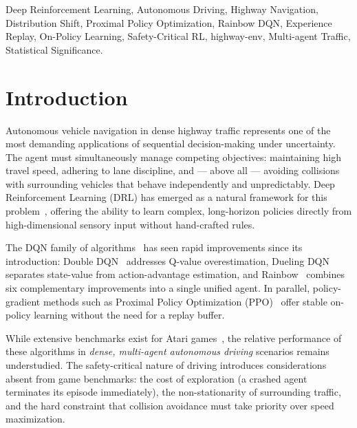 \documentclass[conference]{IEEEtran}
\begin{document}
\begin{IEEEkeywords}
Deep Reinforcement Learning, Autonomous Driving, Highway Navigation, Distribution Shift,
Proximal Policy Optimization, Rainbow DQN, Experience Replay, On-Policy Learning,
Safety-Critical RL, highway-env, Multi-agent Traffic, Statistical Significance.
\end{IEEEkeywords}

\section{Introduction}

Autonomous vehicle navigation in dense highway traffic represents one of the most
demanding applications of sequential decision-making under uncertainty.
The agent must simultaneously manage competing objectives: maintaining high travel speed,
adhering to lane discipline, and — above all — avoiding collisions with surrounding
vehicles that behave independently and unpredictably.
Deep Reinforcement Learning (DRL) has emerged as a natural framework for this
problem~\cite{mnih2015human, lillicrap2015continuous}, offering the ability to learn
complex, long-horizon policies directly from high-dimensional sensory input without
hand-crafted rules.

The DQN family of algorithms~\cite{mnih2015human} has seen rapid improvements since
its introduction: Double DQN~\cite{van2016deep} addresses Q-value overestimation,
Dueling DQN~\cite{wang2016dueling} separates state-value from action-advantage
estimation, and Rainbow~\cite{hessel2018rainbow} combines six complementary
improvements into a single unified agent. In parallel, policy-gradient methods such as
Proximal Policy Optimization (PPO)~\cite{schulman2017proximal} offer stable on-policy
learning without the need for a replay buffer.

While extensive benchmarks exist for Atari games~\cite{hessel2018rainbow}, the
relative performance of these algorithms in \emph{dense, multi-agent autonomous driving}
scenarios remains understudied. The safety-critical nature of driving introduces
considerations absent from game benchmarks: the cost of exploration (a crashed agent
terminates its episode immediately), the non-stationarity of surrounding traffic, and
the hard constraint that collision avoidance must take priority over speed maximization.
\end{document}

